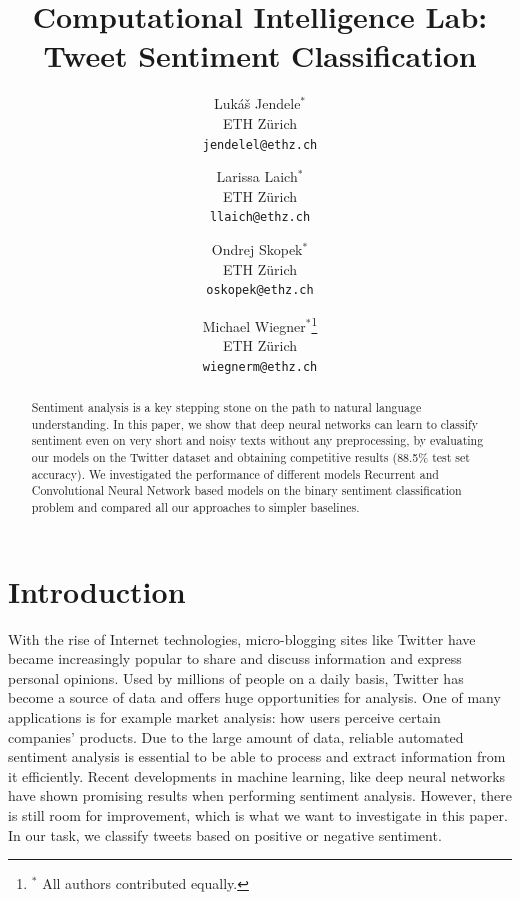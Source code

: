 \documentclass[10pt,conference,compsocconf]{IEEEtran}
\begin{document}
\title{Computational Intelligence Lab: Tweet Sentiment Classification}

\author{
  Luk\'{a}\v{s} Jendele$^\ast$\\
  ETH Z\"{u}rich\\
  \texttt{jendelel@ethz.ch}\\
  \and
  Larissa Laich$^\ast$\\
  ETH Z\"{u}rich\\
  \texttt{llaich@ethz.ch}\\
  \and
  Ondrej Skopek$^\ast$\\
  ETH Z\"{u}rich\\
  \texttt{oskopek@ethz.ch}\\
  \and
  Michael Wiegner$^\ast$\thanks{$^\ast$ All authors contributed equally.}\\
  ETH Z\"{u}rich\\
  \texttt{wiegnerm@ethz.ch}\\
}

\maketitle%

\begin{abstract}
Sentiment analysis is a key stepping stone on the path to natural language understanding. In this paper, we show that deep neural networks can learn to classify sentiment even on very short and noisy texts without any preprocessing, by evaluating our models on the Twitter dataset and obtaining competitive results (88.5\% test set accuracy). We investigated the performance of different models Recurrent and Convolutional Neural Network based models on the binary sentiment classification problem and compared all our approaches to simpler baselines.
\end{abstract}

\section{Introduction}
With the rise of Internet technologies, micro-blogging sites like Twitter have became increasingly popular to share and discuss information and express personal opinions. Used by millions of people on a daily basis, Twitter has become a source of data and offers huge opportunities for analysis. One of many applications is for example market analysis: how users perceive certain companies' products. Due to the large amount of data, reliable automated sentiment analysis is essential to be able to process and extract information from it efficiently. Recent developments in machine learning, like deep neural networks have shown promising results when performing sentiment analysis. However, there is still room for improvement, which is what we want to investigate in this paper. In our task, we classify tweets based on positive or negative sentiment.
\end{document}
